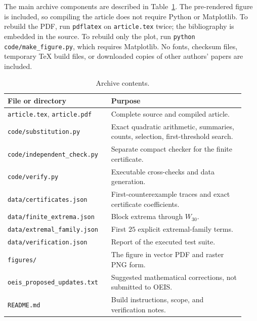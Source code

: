 \documentclass[11pt]{article}
\numberwithin{equation}{section}
\theoremstyle{definition}
\theoremstyle{remark}
\begin{document}
The main archive components are described in Table~\ref{tab:files}.
The pre-rendered figure is included, so compiling the article does not
require Python or Matplotlib. To rebuild the PDF, run \texttt{pdflatex}
on \texttt{article.tex} twice; the bibliography is embedded in the source.
To rebuild only the plot, run \texttt{python code/make\_figure.py}, which
requires Matplotlib. No fonts, checksum files, temporary TeX build files,
or downloaded copies of other authors' papers are included.

\begin{table}[htbp]
\centering\small
\begin{tabular}{p{0.40\linewidth}p{0.53\linewidth}}
\toprule
File or directory & Purpose\\
\midrule
\texttt{article.tex}, \texttt{article.pdf} & Complete source and compiled article.\\
\texttt{code/substitution.py} & Exact quadratic arithmetic, summaries, counts, selection, first-threshold search.\\
\texttt{code/independent\_check.py} & Separate compact checker for the finite certificate.\\
\texttt{code/verify.py} & Executable cross-checks and data generation.\\
\texttt{data/certificates.json} & First-counterexample traces and exact certificate coefficients.\\
\texttt{data/finite\_extrema.json} & Block extrema through $W_{30}$.\\
\texttt{data/extremal\_family.json} & First $25$ explicit extremal-family terms.\\
\texttt{data/verification.json} & Report of the executed test suite.\\
\texttt{figures/} & The figure in vector PDF and raster PNG form.\\
\texttt{oeis\_proposed\_updates.txt} & Suggested mathematical corrections, not submitted to OEIS.\\
\texttt{README.md} & Build instructions, scope, and verification notes.\\
\bottomrule
\end{tabular}
\caption{Archive contents.}\label{tab:files}
\end{table}
\end{document}

